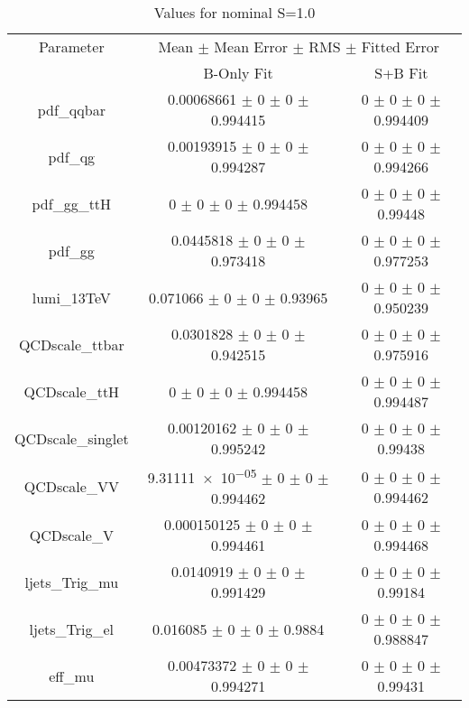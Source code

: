 \begin{table}
\centering
\caption{Values for nominal S=1.0}
\begin{tabular}{ccc}
\toprule
Parameter & \multicolumn{2}{c}{Mean $\pm$ Mean Error $\pm$ RMS $\pm$ Fitted Error}\\
 & B-Only Fit & S+B Fit\\
\midrule
pdf\_qqbar & \num{0.00068661} $\pm$ \num{0} $\pm$ \num{0} $\pm$ \num{0.994415} & \num{0} $\pm$ \num{0} $\pm$ \num{0} $\pm$ \num{0.994409}\\
pdf\_qg & \num{0.00193915} $\pm$ \num{0} $\pm$ \num{0} $\pm$ \num{0.994287} & \num{0} $\pm$ \num{0} $\pm$ \num{0} $\pm$ \num{0.994266}\\
pdf\_gg\_ttH & \num{0} $\pm$ \num{0} $\pm$ \num{0} $\pm$ \num{0.994458} & \num{0} $\pm$ \num{0} $\pm$ \num{0} $\pm$ \num{0.99448}\\
pdf\_gg & \num{0.0445818} $\pm$ \num{0} $\pm$ \num{0} $\pm$ \num{0.973418} & \num{0} $\pm$ \num{0} $\pm$ \num{0} $\pm$ \num{0.977253}\\
lumi\_13TeV & \num{0.071066} $\pm$ \num{0} $\pm$ \num{0} $\pm$ \num{0.93965} & \num{0} $\pm$ \num{0} $\pm$ \num{0} $\pm$ \num{0.950239}\\
QCDscale\_ttbar & \num{0.0301828} $\pm$ \num{0} $\pm$ \num{0} $\pm$ \num{0.942515} & \num{0} $\pm$ \num{0} $\pm$ \num{0} $\pm$ \num{0.975916}\\
QCDscale\_ttH & \num{0} $\pm$ \num{0} $\pm$ \num{0} $\pm$ \num{0.994458} & \num{0} $\pm$ \num{0} $\pm$ \num{0} $\pm$ \num{0.994487}\\
QCDscale\_singlet & \num{0.00120162} $\pm$ \num{0} $\pm$ \num{0} $\pm$ \num{0.995242} & \num{0} $\pm$ \num{0} $\pm$ \num{0} $\pm$ \num{0.99438}\\
QCDscale\_VV & \num{9.31111e-05} $\pm$ \num{0} $\pm$ \num{0} $\pm$ \num{0.994462} & \num{0} $\pm$ \num{0} $\pm$ \num{0} $\pm$ \num{0.994462}\\
QCDscale\_V & \num{0.000150125} $\pm$ \num{0} $\pm$ \num{0} $\pm$ \num{0.994461} & \num{0} $\pm$ \num{0} $\pm$ \num{0} $\pm$ \num{0.994468}\\
ljets\_Trig\_mu & \num{0.0140919} $\pm$ \num{0} $\pm$ \num{0} $\pm$ \num{0.991429} & \num{0} $\pm$ \num{0} $\pm$ \num{0} $\pm$ \num{0.99184}\\
ljets\_Trig\_el & \num{0.016085} $\pm$ \num{0} $\pm$ \num{0} $\pm$ \num{0.9884} & \num{0} $\pm$ \num{0} $\pm$ \num{0} $\pm$ \num{0.988847}\\
eff\_mu & \num{0.00473372} $\pm$ \num{0} $\pm$ \num{0} $\pm$ \num{0.994271} & \num{0} $\pm$ \num{0} $\pm$ \num{0} $\pm$ \num{0.99431}\\

\end{tabular}
\end{table}
